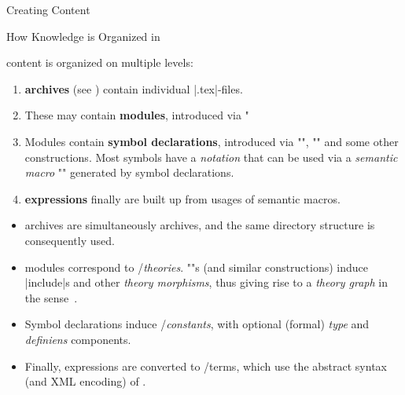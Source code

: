 \begin{sfragment}{Creating \sTeX Content}

  

  \begin{sfragment}{How Knowledge is Organized in \sTeX}

    \sTeX content is organized on multiple levels:
    \begin{enumerate}
      \item \sTeX \textbf{archives} (see )
        contain individual |.tex|-files.
      \item These may contain \sTeX \textbf{modules}, introduced via 
      \stexcode"\fi
      \item Modules contain \sTeX \textbf{symbol declarations}, introduced via
        \stexcode"", \stexcode"" and some other
        constructions. Most symbols have a \emph{notation} that can
        be used via a \emph{semantic macro} \stexcode"\symbolname" generated
        by symbol declarations.
      \item \sTeX \textbf{expressions} finally are built up from
        usages of semantic macros.
    \end{enumerate}

    \begin{mmtbox}
      \begin{itemize}
      \item \sTeX archives are simultaneously \mmt archives, and the same directory
        structure is consequently used.
      \item \sTeX modules correspond to \omdoc/\mmt \emph{theories}.
        \stexcode"\importmodule"s (and similar constructions) induce \mmt |include|s and
        other \emph{theory morphisms}, thus giving rise to a \emph{theory graph} in the
        \omdoc sense~\cite{RabKoh:WSMSML13}.
      \item Symbol declarations induce \omdoc/\mmt \emph{constants}, with optional
        (formal) \emph{type} and \emph{definiens} components.
      \item Finally, \sTeX expressions are converted to \omdoc/\mmt terms, which use the
        abstract syntax (and XML encoding) of \openmath \cite{BusCapCar:2oms04}.
      \end{itemize}
    \end{mmtbox}
  \end{sfragment}


\end{sfragment}

